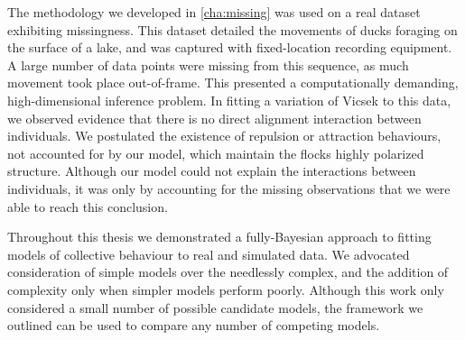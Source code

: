 The methodology we developed in \cref{cha:missing} was used on a real dataset
exhibiting missingness. This dataset detailed the movements of ducks
foraging on the surface of a lake, and was captured with fixed-location
recording equipment. A large number of data points were missing from this
sequence, as much movement took place out-of-frame. This presented a
computationally demanding, high-dimensional inference problem. In fitting a
variation of Vicsek to this data, we observed evidence that there is no direct
alignment interaction between individuals. We postulated the existence of
repulsion or attraction behaviours, not accounted for by our model, which
maintain the flocks highly polarized structure. Although our model could not
explain the interactions between individuals, it was only by accounting for the
missing observations that we were able to reach this conclusion.

Throughout this thesis we demonstrated a fully-Bayesian approach to fitting
models of collective behaviour to real and simulated data. We advocated
consideration of simple models over the needlessly complex, and the addition of
complexity only when simpler models perform poorly. Although this work only
considered a small number of possible candidate models, the framework we
outlined can be used to compare any number of competing models.
